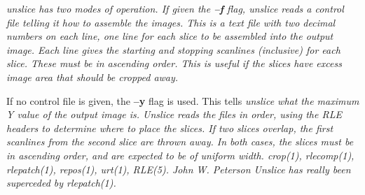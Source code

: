 %
\it unslice \rm%
has two modes of operation.  If given the
{\bf --f}
flag, %
\it unslice \rm%
reads a control file telling it how to assemble
the images.  This is a text file with two decimal numbers on each
line, one line for each slice to be assembled into the output image.
Each line gives the starting and stopping scanlines (inclusive) for
each slice.  These must be in ascending order.  This is useful if the
slices have excess image area that should be cropped away.

If no control file is given, the
{\bf --y}
flag is used.  This tells %
\it unslice \rm%
what the maximum Y value of
the output image is.
{\it Unslice}
reads the files in order, using the RLE headers to 
determine where to place the slices.  If two slices overlap, the first 
scanlines from the second slice are thrown away.  In both cases, the slices
must be in ascending order, and are expected to be of uniform width.
{\it crop}{\rm (1),}
{\it rlecomp}{\rm (1),}
{\it rlepatch}{\rm (1),}
{\it repos}{\rm (1),}
{\it urt}{\rm (1),}
{\it RLE}{\rm (5).}
John W. Peterson
{\it Unslice}
has really been superceded by 
{\it rlepatch}{\rm (1).}
\newpage


